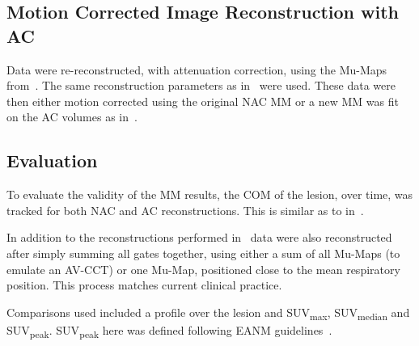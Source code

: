             \subsection{Motion Corrected Image Reconstruction with AC} \label{sec:pet_ct_respiratory_motion_correction_with_a_single_attenuation_map_using_nac_derived_deformation_fields_methods_attenuation_corrected_image_reconstruction}
                Data were re-reconstructed, with attenuation correction, using the \glspl{Mu-Map} from~. The same reconstruction parameters as in~ were used. These data were then either motion corrected using the original \gls{NAC} \gls{MM} or a new \gls{MM} was fit on the \gls{AC} volumes as in~.
            
            \subsection{Evaluation} \label{sec:pet_ct_respiratory_motion_correction_with_a_single_attenuation_map_using_nac_derived_deformation_fields_methods_evaluation}
                To evaluate the validity of the \gls{MM} results, the \gls{COM} of the lesion, over time, was tracked for both \gls{NAC} and \gls{AC} reconstructions. This is similar as to in~.
                
                In addition to the reconstructions performed in~ data were also reconstructed after simply summing all gates together, using either a sum of all \glspl{Mu-Map} (to emulate an \gls{AV-CCT}) or one \gls{Mu-Map}, positioned close to the mean respiratory position. This process matches current clinical practice. 
                
                Comparisons used included a profile over the lesion and \gls{SUV}\textsubscript{max}, \gls{SUV}\textsubscript{median} and \gls{SUV}\textsubscript{peak}. \gls{SUV}\textsubscript{peak} here was defined following \gls{EANM} guidelines~\parencite{Boellaard2015FDG2.0}.
            

